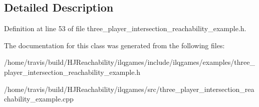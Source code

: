 \subsection{Detailed Description}


Definition at line 53 of file three\+\_\+player\+\_\+intersection\+\_\+reachability\+\_\+example.\+h.



The documentation for this class was generated from the following files\+:\begin{DoxyCompactItemize}
\item 
/home/travis/build/\+H\+J\+Reachability/ilqgames/include/ilqgames/examples/three\+\_\+player\+\_\+intersection\+\_\+reachability\+\_\+example.\+h\item 
/home/travis/build/\+H\+J\+Reachability/ilqgames/src/three\+\_\+player\+\_\+intersection\+\_\+reachability\+\_\+example.\+cpp\end{DoxyCompactItemize}
